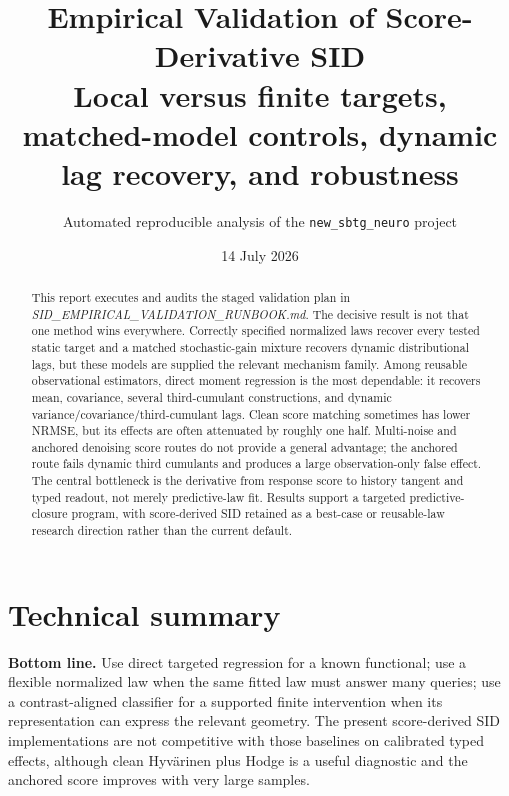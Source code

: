 \documentclass[11pt]{article}
\title{\textbf{Empirical Validation of Score-Derivative SID}\\
\large Local versus finite targets, matched-model controls, dynamic lag recovery, and robustness}
\author{Automated reproducible analysis of the \texttt{new\_sbtg\_neuro} project}
\date{14 July 2026}
\begin{document}
\maketitle

\begin{abstract}
This report executes and audits the staged validation plan in
\emph{SID\_EMPIRICAL\_VALIDATION\_RUNBOOK.md}.  The decisive result is not that one
method wins everywhere.  Correctly specified normalized laws recover every tested
static target and a matched stochastic-gain mixture recovers dynamic distributional
lags, but these models are supplied the relevant mechanism family.  Among reusable
observational estimators, direct moment regression is the most dependable: it
recovers mean, covariance, several third-cumulant constructions, and dynamic
variance/covariance/third-cumulant lags.  Clean score matching sometimes has lower
NRMSE, but its effects are often attenuated by roughly one half.  Multi-noise and
anchored denoising score routes do not provide a general advantage; the anchored
route fails dynamic third cumulants and produces a large observation-only false
effect.  The central bottleneck is the derivative from response score to history
tangent and typed readout, not merely predictive-law fit.  Results support a
targeted predictive-closure program, with score-derived SID retained as a
best-case or reusable-law research direction rather than the current default.
\end{abstract}

\section*{Technical summary}

\noindent\colorbox{gray!10}{\parbox{0.97\linewidth}{
\textbf{Bottom line.}  Use direct targeted regression for a known functional;
use a flexible normalized law when the same fitted law must answer many queries;
use a contrast-aligned classifier for a supported finite intervention when its
representation can express the relevant geometry.  The present score-derived SID
implementations are not competitive with those baselines on calibrated typed
effects, although clean Hyv\"arinen plus Hodge is a useful diagnostic and the
anchored score improves with very large samples.
}}
\end{document}
